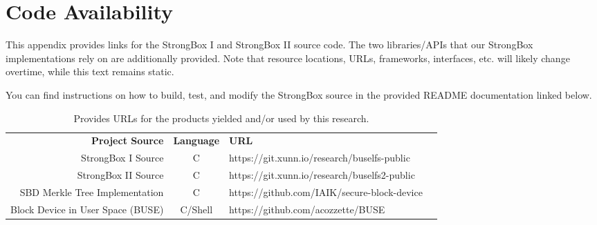 \renewcommand\thechapter{A}
\chapter{Code Availability} \label{chp:availability}

This appendix provides links for the StrongBox I and StrongBox II source code.
The two libraries/APIs that our StrongBox implementations rely on are
additionally provided. Note that resource locations, URLs, frameworks,
interfaces, etc. will likely change overtime, while this text remains static.

You can find instructions on how to build, test, and modify the StrongBox source
in the provided README documentation linked below.

\begin{table}
    \centering
    \caption{Provides URLs for the products yielded and/or used by this research.}
    \begin{tabular}{|r|c|l|l}
        \cline{1-3}
        \textbf{Project Source} & \textbf{Language} & \textbf{URL} & \\
        \cline{1-3}
        StrongBox I Source & C & https://git.xunn.io/research/buselfs-public & \\
        StrongBox II Source & C & https://git.xunn.io/research/buselfs2-public & \\
        SBD Merkle Tree Implementation & C & https://github.com/IAIK/secure-block-device & \\
        Block Device in User Space (BUSE) & C/Shell & https://github.com/acozzette/BUSE & \\
        \cline{1-3}
    \end{tabular}
\end{table}

